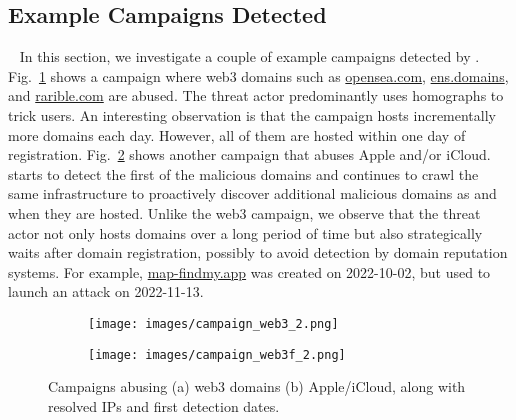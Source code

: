\subsection{Example Campaigns Detected}~\label{ss:campaigns}
In this section, we investigate a couple of example campaigns detected by \system. 
Fig.~\ref{fig:campaignweb3} shows a campaign where web3 domains such as \url{opensea.com}, \url{ens.domains}, and \url{rarible.com} are abused. The threat actor predominantly uses homographs to trick users. 
An interesting observation is that the campaign hosts incrementally more domains each day. However, all of them are hosted within one day of registration. Fig.~\ref{fig:campaignicloud} shows another campaign that abuses Apple and/or iCloud. \system starts to detect the first of the malicious domains and continues to crawl the same infrastructure to proactively discover additional malicious domains as and when they are hosted. Unlike the web3 campaign, we observe that the threat actor not only hosts domains over a long period of time but also strategically waits after domain registration, possibly to avoid detection by domain reputation systems. For example, \url{map-findmy.app} was created on 2022-10-02, but used to launch an attack on 2022-11-13.


\begin{figure}
\centering
\begin{subfigure}[t]{0.85\linewidth}
    \texttt{[image: images/campaign\_web3\_2.png]}
    \caption{}
    \label{fig:campaignweb3}
  \end{subfigure}  \hfill
  \begin{subfigure}[t]{0.85\linewidth}
    \texttt{[image: images/campaign\_web3f\_2.png]}
    \caption{}
    \label{fig:campaignicloud}
  \end{subfigure}\hfill
  \caption{Campaigns abusing (a) web3 domains (b) Apple/iCloud, along with resolved IPs and first detection dates.}
  \label{fig:campaigns}
\end{figure}

